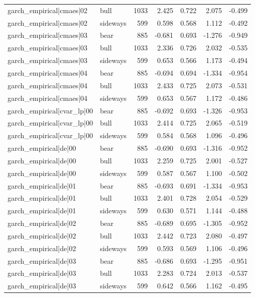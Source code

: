 \begin{table}
\begin{tabular}{llrrrrr}
garch\_empirical|cmaes|02 & bull & 1033 & 2.425 & 0.722 & 2.075 & -0.499 \\
garch\_empirical|cmaes|02 & sideways & 599 & 0.598 & 0.568 & 1.112 & -0.492 \\
garch\_empirical|cmaes|03 & bear & 885 & -0.681 & 0.693 & -1.276 & -0.949 \\
garch\_empirical|cmaes|03 & bull & 1033 & 2.336 & 0.726 & 2.032 & -0.535 \\
garch\_empirical|cmaes|03 & sideways & 599 & 0.653 & 0.566 & 1.173 & -0.494 \\
garch\_empirical|cmaes|04 & bear & 885 & -0.694 & 0.694 & -1.334 & -0.954 \\
garch\_empirical|cmaes|04 & bull & 1033 & 2.433 & 0.725 & 2.073 & -0.531 \\
garch\_empirical|cmaes|04 & sideways & 599 & 0.653 & 0.567 & 1.172 & -0.486 \\
garch\_empirical|cvar\_lp|00 & bear & 885 & -0.692 & 0.693 & -1.326 & -0.953 \\
garch\_empirical|cvar\_lp|00 & bull & 1033 & 2.414 & 0.725 & 2.065 & -0.519 \\
garch\_empirical|cvar\_lp|00 & sideways & 599 & 0.584 & 0.568 & 1.096 & -0.496 \\
garch\_empirical|de|00 & bear & 885 & -0.690 & 0.693 & -1.316 & -0.952 \\
garch\_empirical|de|00 & bull & 1033 & 2.259 & 0.725 & 2.001 & -0.527 \\
garch\_empirical|de|00 & sideways & 599 & 0.587 & 0.567 & 1.100 & -0.502 \\
garch\_empirical|de|01 & bear & 885 & -0.693 & 0.691 & -1.334 & -0.953 \\
garch\_empirical|de|01 & bull & 1033 & 2.401 & 0.728 & 2.054 & -0.529 \\
garch\_empirical|de|01 & sideways & 599 & 0.630 & 0.571 & 1.144 & -0.488 \\
garch\_empirical|de|02 & bear & 885 & -0.689 & 0.695 & -1.305 & -0.952 \\
garch\_empirical|de|02 & bull & 1033 & 2.442 & 0.723 & 2.080 & -0.497 \\
garch\_empirical|de|02 & sideways & 599 & 0.593 & 0.569 & 1.106 & -0.496 \\
garch\_empirical|de|03 & bear & 885 & -0.686 & 0.693 & -1.295 & -0.951 \\
garch\_empirical|de|03 & bull & 1033 & 2.283 & 0.724 & 2.013 & -0.537 \\
garch\_empirical|de|03 & sideways & 599 & 0.642 & 0.566 & 1.162 & -0.495 \\

\end{tabular}
\end{table}
